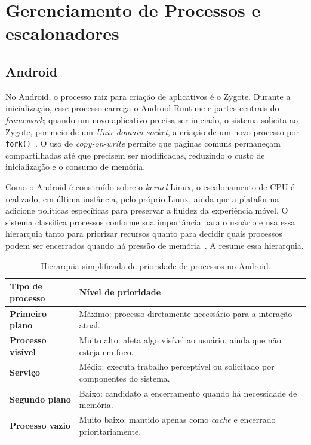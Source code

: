 \documentclass[12pt,a4paper]{article}
\begin{document}
\section{Gerenciamento de Processos e escalonadores}
\label{sec:gerenciamento}

\subsection{Android}

No Android, o processo raiz para criação de aplicativos é o Zygote. Durante a
inicialização, esse processo carrega o Android Runtime e partes centrais do
\emph{framework}; quando um novo aplicativo precisa ser iniciado, o sistema
solicita ao Zygote, por meio de um \emph{Unix domain socket}, a criação de um
novo processo por \texttt{fork()}~\cite{android_zygote}. O uso de
\emph{copy-on-write} permite que páginas comuns permaneçam compartilhadas até
que precisem ser modificadas, reduzindo o custo de inicialização e o consumo de
memória.

Como o Android é construído sobre o \emph{kernel} Linux, o escalonamento de CPU é
realizado, em última instância, pelo próprio Linux, ainda que a plataforma
adicione políticas específicas para preservar a fluidez da experiência móvel. O
sistema classifica processos conforme sua importância para o usuário e usa essa
hierarquia tanto para priorizar recursos quanto para decidir quais processos
podem ser encerrados quando há pressão de memória~\cite{android_process_lifecycle,
android_memory_mgmt}. A  resume essa hierarquia.

\begin{table}[htbp]
  \centering
  \caption{Hierarquia simplificada de prioridade de processos no Android.}
  \label{tab:android-processos}
  \begin{tabular}{>{\bfseries}p{4cm} p{8cm}}
    \toprule
    Tipo de processo & Nível de prioridade \\
    \midrule
    Primeiro plano & Máximo: processo diretamente necessário para a interação atual. \\
    Processo visível & Muito alto: afeta algo visível ao usuário, ainda que não esteja em foco. \\
    Serviço & Médio: executa trabalho perceptível ou solicitado por componentes do sistema. \\
    Segundo plano & Baixo: candidato a encerramento quando há necessidade de memória. \\
    Processo vazio & Muito baixo: mantido apenas como \emph{cache} e encerrado prioritariamente. \\
    \bottomrule
  \end{tabular}
\end{table}
\end{document}
